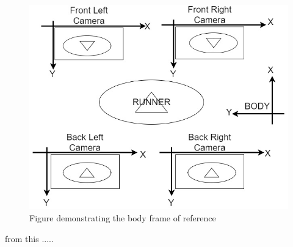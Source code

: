 \begin{figure}[!ht] 
\captionsetup{width=0.8\linewidth, font=small}  
\includegraphics[width=0.5\linewidth]{figures/forrr.jpg}
\caption{Figure demonstrating the body frame of reference}
\label{fig:forrr}
\end{figure}


from this .....













